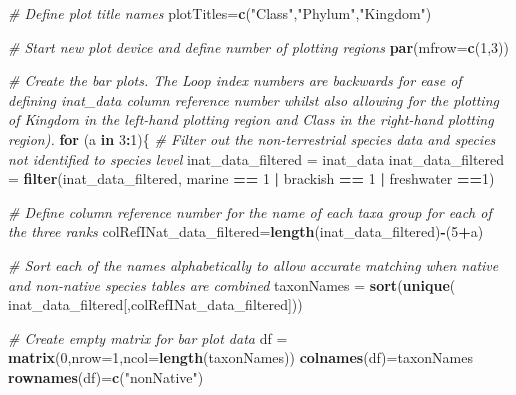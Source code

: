 \documentclass[
  12pt,
]{article}
\newenvironment{Shaded}{\begin{snugshade}}{\end{snugshade}}
\newcommand{\AttributeTok}[1]{\textcolor[rgb]{0.13,0.29,0.53}{#1}}
\newcommand{\CommentTok}[1]{\textcolor[rgb]{0.56,0.35,0.01}{\textit{#1}}}
\newcommand{\ControlFlowTok}[1]{\textcolor[rgb]{0.13,0.29,0.53}{\textbf{#1}}}
\newcommand{\DecValTok}[1]{\textcolor[rgb]{0.00,0.00,0.81}{#1}}
\newcommand{\FunctionTok}[1]{\textcolor[rgb]{0.13,0.29,0.53}{\textbf{#1}}}
\newcommand{\NormalTok}[1]{#1}
\newcommand{\OtherTok}[1]{\textcolor[rgb]{0.56,0.35,0.01}{#1}}
\newcommand{\SpecialCharTok}[1]{\textcolor[rgb]{0.81,0.36,0.00}{\textbf{#1}}}
\newcommand{\StringTok}[1]{\textcolor[rgb]{0.31,0.60,0.02}{#1}}
\begin{document}
\begin{Shaded}
\begin{Highlighting}[]
\CommentTok{\# Define plot title names}
\NormalTok{plotTitles}\OtherTok{=}\FunctionTok{c}\NormalTok{(}\StringTok{"Class"}\NormalTok{,}\StringTok{"Phylum"}\NormalTok{,}\StringTok{"Kingdom"}\NormalTok{)}

\CommentTok{\# Start new plot device and define number of plotting regions}
\FunctionTok{par}\NormalTok{(}\AttributeTok{mfrow=}\FunctionTok{c}\NormalTok{(}\DecValTok{1}\NormalTok{,}\DecValTok{3}\NormalTok{))}

\CommentTok{\# Create the bar plots. The Loop index numbers are backwards for ease of defining inat\_data column reference number whilst also allowing for the plotting of Kingdom in the left{-}hand plotting region and Class in the right{-}hand plotting region).}
\ControlFlowTok{for}\NormalTok{ (a }\ControlFlowTok{in} \DecValTok{3}\SpecialCharTok{:}\DecValTok{1}\NormalTok{)\{}
  \CommentTok{\# Filter out the non{-}terrestrial species data and species not identified to species level}
\NormalTok{  inat\_data\_filtered }\OtherTok{=}\NormalTok{ inat\_data}
\NormalTok{  inat\_data\_filtered }\OtherTok{=} \FunctionTok{filter}\NormalTok{(inat\_data\_filtered,}
\NormalTok{                              marine }\SpecialCharTok{==} \DecValTok{1} \SpecialCharTok{|}\NormalTok{ brackish }\SpecialCharTok{==} \DecValTok{1} \SpecialCharTok{|}\NormalTok{ freshwater }\SpecialCharTok{==}\DecValTok{1}\NormalTok{)}
  
  \CommentTok{\# Define column reference number for the name of each taxa group for each of the three ranks}
\NormalTok{  colRefINat\_data\_filtered}\OtherTok{=}\FunctionTok{length}\NormalTok{(inat\_data\_filtered)}\SpecialCharTok{{-}}\NormalTok{(}\DecValTok{5}\SpecialCharTok{+}\NormalTok{a)}
  
  \CommentTok{\# Sort each of the names alphabetically to allow accurate matching when native and non{-}native species tables are combined}
\NormalTok{  taxonNames }\OtherTok{=} \FunctionTok{sort}\NormalTok{(}\FunctionTok{unique}\NormalTok{(}
\NormalTok{    inat\_data\_filtered[,colRefINat\_data\_filtered]))}
  
  \CommentTok{\# Create empty matrix for bar plot data}
\NormalTok{  df }\OtherTok{=} \FunctionTok{matrix}\NormalTok{(}\DecValTok{0}\NormalTok{,}\AttributeTok{nrow=}\DecValTok{1}\NormalTok{,}\AttributeTok{ncol=}\FunctionTok{length}\NormalTok{(taxonNames))}
  \FunctionTok{colnames}\NormalTok{(df)}\OtherTok{=}\NormalTok{taxonNames}
  \FunctionTok{rownames}\NormalTok{(df)}\OtherTok{=}\FunctionTok{c}\NormalTok{(}\StringTok{"nonNative"}\NormalTok{)}
  

\end{Highlighting}
\end{Shaded}
\end{document}
